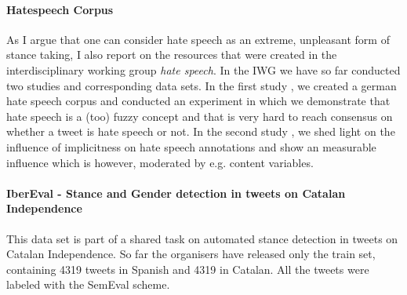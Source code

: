 \documentclass[11pt]{article}
\begin{document}
\paragraph{Hatespeech Corpus \cite{hatespeech2016}}
As I argue that one can consider hate speech as an extreme, unpleasant form of stance taking, I also report on the resources that were created in the interdisciplinary working group \textit{hate speech}.
In the IWG we have so far conducted two studies and corresponding data sets.
In the first study \cite{hatespeech2016}, we created a german hate speech corpus and conducted an experiment in which we demonstrate that hate speech is a (too) fuzzy concept and that is very hard to reach consensus on whether a tweet is hate speech or not.
In the second study \cite{hatespeech2017implicitness}, we shed light on the influence of implicitness on hate speech annotations and show an measurable influence which is however, moderated by e.g. content variables. 

\paragraph{IberEval - Stance and Gender detection in tweets on Catalan Independence \cite{iberEval2017}}
This data set is part of a shared task on automated stance detection in tweets on Catalan Independence.
So far the organisers have released only the train set, containing 4319 tweets in Spanish and 4319 in Catalan.
All the tweets were labeled with the SemEval scheme.
%
%
%
%
%
%
\end{document}
